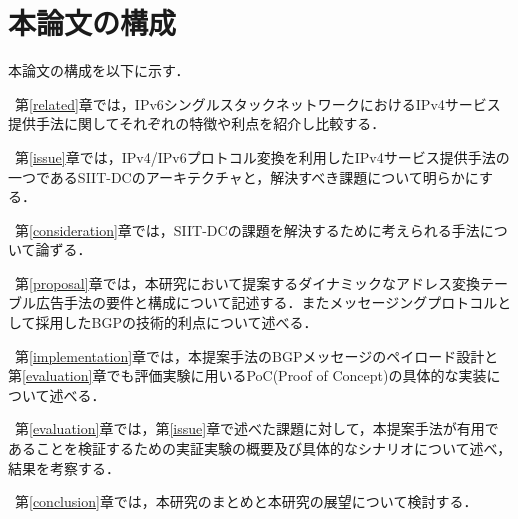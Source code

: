 


\section{本論文の構成}

本論文の構成を以下に示す．

~第\ref{related}章では，IPv6シングルスタックネットワークにおけるIPv4サービス提供手法に関してそれぞれの特徴や利点を紹介し比較する．

~第\ref{issue}章では，IPv4/IPv6プロトコル変換を利用したIPv4サービス提供手法の一つであるSIIT-DCのアーキテクチャと，解決すべき課題について明らかにする．

~第\ref{consideration}章では，SIIT-DCの課題を解決するために考えられる手法について論ずる．

~第\ref{proposal}章では，本研究において提案するダイナミックなアドレス変換テーブル広告手法の要件と構成について記述する．またメッセージングプロトコルとして採用したBGPの技術的利点について述べる．

~第\ref{implementation}章では，本提案手法のBGPメッセージのペイロード設計と第\ref{evaluation}章でも評価実験に用いるPoC(Proof of Concept)の具体的な実装について述べる．

~第\ref{evaluation}章では，第\ref{issue}章で述べた課題に対して，本提案手法が有用であることを検証するための実証実験の概要及び具体的なシナリオについて述べ，結果を考察する．

~第\ref{conclusion}章では，本研究のまとめと本研究の展望について検討する．


